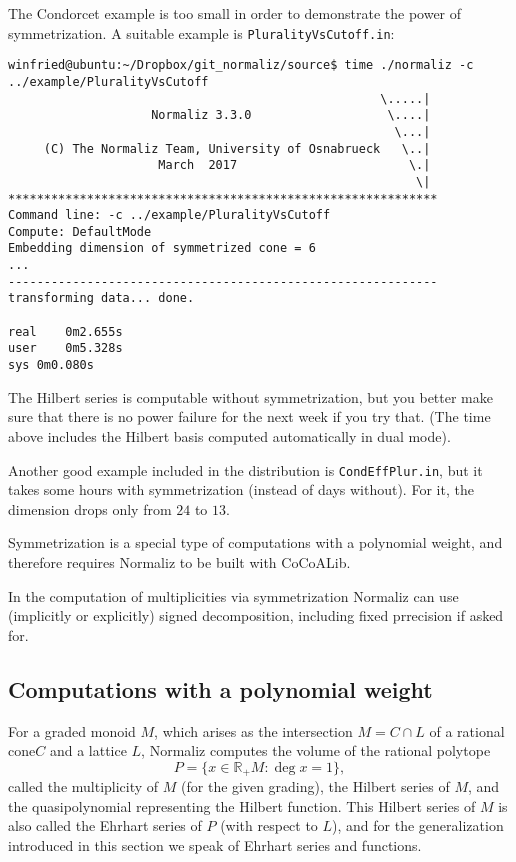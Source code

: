 \documentclass[12pt,a4paper]{scrartcl}
\theoremstyle{definition}
\def\RR{{\mathbb R}}
\begin{document}
The Condorcet example is too small in order to demonstrate the power of symmetrization. A suitable example is \verb|PluralityVsCutoff.in|:
\begin{Verbatim}
winfried@ubuntu:~/Dropbox/git_normaliz/source$ time ./normaliz -c ../example/PluralityVsCutoff
                                                    \.....|
                    Normaliz 3.3.0                   \....|
                                                      \...|
     (C) The Normaliz Team, University of Osnabrueck   \..|
                     March  2017                        \.|
                                                         \|
************************************************************
Command line: -c ../example/PluralityVsCutoff 
Compute: DefaultMode 
Embedding dimension of symmetrized cone = 6
...
------------------------------------------------------------
transforming data... done.

real	0m2.655s
user	0m5.328s
sys	0m0.080s
\end{Verbatim}
The Hilbert series is computable without symmetrization, but you better make sure that there is no power failure for the next week if you try that. (The time above includes the Hilbert basis computed automatically in dual mode).

Another good example included in the distribution is \verb|CondEffPlur.in|, but it takes some hours with symmetrization (instead of days without). For it, the dimension drops only from $24$ to $13$.

Symmetrization is a special type of computations with a polynomial weight, and therefore requires Normaliz to be built with CoCoALib.

In the computation of multiplicities via symmetrization Normaliz can use (implicitly or explicitly) signed decomposition, including fixed prrecision if asked for.

\subsection{Computations with a polynomial weight}\label{Poly_comp}

For a graded monoid $M$, which arises as the intersection $M=C\cap L$ of a rational cone$C$ and a lattice $L$, Normaliz computes the volume of
the rational polytope
$$
P=\{x\in \RR_+ M: \deg x=1\},
$$
called the multiplicity of $M$ (for the given grading), the Hilbert series of $M$, and the quasipolynomial representing the Hilbert function. This Hilbert series of $M$ is also called the Ehrhart series of $P$ (with respect to $L$), and for the generalization introduced in this section we speak of Ehrhart series and functions.
\end{document}
